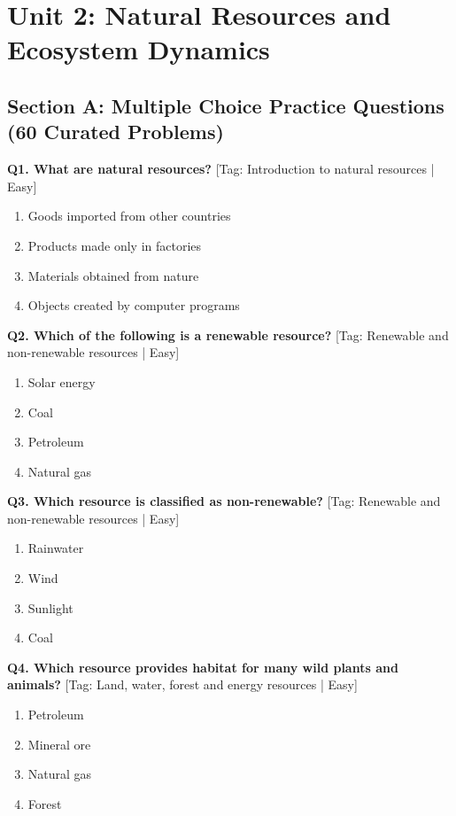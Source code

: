 \chapter{Unit 2: Natural Resources and Ecosystem Dynamics}

\section{Section A: Multiple Choice Practice Questions (60 Curated Problems)}

\noindent\textbf{Q1. What are natural resources?} \hfill [Tag: Introduction to natural resources | Easy]
\begin{enumerate}[label=(\alph*),topsep=2pt,itemsep=1pt,partopsep=0pt,parsep=0pt]
    \item {Goods imported from other countries}
    \item {Products made only in factories}
    \item {Materials obtained from nature}
    \item {Objects created by computer programs}
\end{enumerate}
\vspace{2mm}

\noindent\textbf{Q2. Which of the following is a renewable resource?} \hfill [Tag: Renewable and non-renewable resources | Easy]
\begin{enumerate}[label=(\alph*),topsep=2pt,itemsep=1pt,partopsep=0pt,parsep=0pt]
    \item {Solar energy}
    \item {Coal}
    \item {Petroleum}
    \item {Natural gas}
\end{enumerate}
\vspace{2mm}

\noindent\textbf{Q3. Which resource is classified as non-renewable?} \hfill [Tag: Renewable and non-renewable resources | Easy]
\begin{enumerate}[label=(\alph*),topsep=2pt,itemsep=1pt,partopsep=0pt,parsep=0pt]
    \item {Rainwater}
    \item {Wind}
    \item {Sunlight}
    \item {Coal}
\end{enumerate}
\vspace{2mm}

\noindent\textbf{Q4. Which resource provides habitat for many wild plants and animals?} \hfill [Tag: Land, water, forest and energy resources | Easy]
\begin{enumerate}[label=(\alph*),topsep=2pt,itemsep=1pt,partopsep=0pt,parsep=0pt]
    \item {Petroleum}
    \item {Mineral ore}
    \item {Natural gas}
    \item {Forest}
\end{enumerate}
\vspace{2mm}


